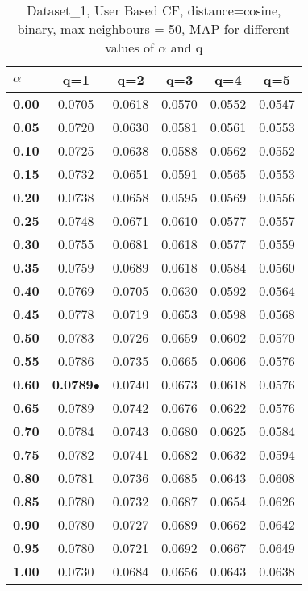 \begin{table}
\begin{center}
\begin{tabular}{ | l || c | c | c | c | c |}
\hline
\textbf{$\alpha$} & \textbf{q=1} & \textbf{q=2} & \textbf{q=3} & \textbf{q=4} & \textbf{q=5} \\
\hline
\textbf{0.00} & 0.0705 & 0.0618 & 0.0570 & 0.0552 & 0.0547\\
\hline
\textbf{0.05} & 0.0720 & 0.0630 & 0.0581 & 0.0561 & 0.0553\\
\hline
\textbf{0.10} & 0.0725 & 0.0638 & 0.0588 & 0.0562 & 0.0552\\
\hline
\textbf{0.15} & 0.0732 & 0.0651 & 0.0591 & 0.0565 & 0.0553\\
\hline
\textbf{0.20} & 0.0738 & 0.0658 & 0.0595 & 0.0569 & 0.0556\\
\hline
\textbf{0.25} & 0.0748 & 0.0671 & 0.0610 & 0.0577 & 0.0557\\
\hline
\textbf{0.30} & 0.0755 & 0.0681 & 0.0618 & 0.0577 & 0.0559\\
\hline
\textbf{0.35} & 0.0759 & 0.0689 & 0.0618 & 0.0584 & 0.0560\\
\hline
\textbf{0.40} & 0.0769 & 0.0705 & 0.0630 & 0.0592 & 0.0564\\
\hline
\textbf{0.45} & 0.0778 & 0.0719 & 0.0653 & 0.0598 & 0.0568\\
\hline
\textbf{0.50} & 0.0783 & 0.0726 & 0.0659 & 0.0602 & 0.0570\\
\hline
\textbf{0.55} & 0.0786 & 0.0735 & 0.0665 & 0.0606 & 0.0576\\
\hline
\textbf{0.60} & \textbf{0.0789}$\bullet$ & 0.0740 & 0.0673 & 0.0618 & 0.0576\\
\hline
\textbf{0.65} & 0.0789 & 0.0742 & 0.0676 & 0.0622 & 0.0576\\
\hline
\textbf{0.70} & 0.0784 & 0.0743 & 0.0680 & 0.0625 & 0.0584\\
\hline
\textbf{0.75} & 0.0782 & 0.0741 & 0.0682 & 0.0632 & 0.0594\\
\hline
\textbf{0.80} & 0.0781 & 0.0736 & 0.0685 & 0.0643 & 0.0608\\
\hline
\textbf{0.85} & 0.0780 & 0.0732 & 0.0687 & 0.0654 & 0.0626\\
\hline
\textbf{0.90} & 0.0780 & 0.0727 & 0.0689 & 0.0662 & 0.0642\\
\hline
\textbf{0.95} & 0.0780 & 0.0721 & 0.0692 & 0.0667 & 0.0649\\
\hline
\textbf{1.00} & 0.0730 & 0.0684 & 0.0656 & 0.0643 & 0.0638\\
\hline
\end{tabular}
\caption{Dataset\_1, User Based CF, distance=cosine, binary, max neighbours = 50, MAP for different values of $\alpha$ and q}
\label{table:MAP_Dataset_1_ucf_cosine_binary_mnn=50}
\end{center}
\end{table}
